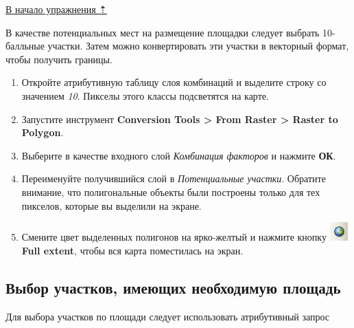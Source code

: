 \documentclass[]{book}
\theoremstyle{definition}
\theoremstyle{definition}
\theoremstyle{definition}
\theoremstyle{remark}
\begin{document}
\protect\hyperlink{weighted-overlay}{В начало упражнения ⇡}

В качестве потенциальных мест на размещение площадки следует выбрать
10-балльные участки. Затем можно конвертировать эти участки в векторный
формат, чтобы получить границы.

\begin{enumerate}
\def\labelenumi{\arabic{enumi}.}
\item
  Откройте атрибутивную таблицу слоя комбинаций и выделите строку со
  значением \emph{10}. Пикселы этого классы подсветятся на карте.
\item
  Запустите инструмент \textbf{Conversion Tools \textgreater{} From
  Raster \textgreater{} Raster to Polygon}.
\item
  Выберите в качестве входного слой \emph{Комбинация факторов} и нажмите
  \textbf{ОК}.
\item
  Переименуйте получившийся слой в \emph{Потенциальные участки}.
  Обратите внимание, что полигональные объекты были построены только для
  тех пикселов, которые вы выделили на экране.
\item
  Смените цвет выделенных полигонов на ярко-желтый и нажмите кнопку
  \includegraphics{images/Ex14/image5.png} \textbf{Full extent}, чтобы
  вся карта поместилась на экран.
\end{enumerate}

\hypertarget{weighted-overlay-area}{%
\subsection{Выбор участков, имеющих необходимую
площадь}\label{weighted-overlay-area}}

Для выбора участков по площади следует использовать атрибутивный запрос
\end{document}
